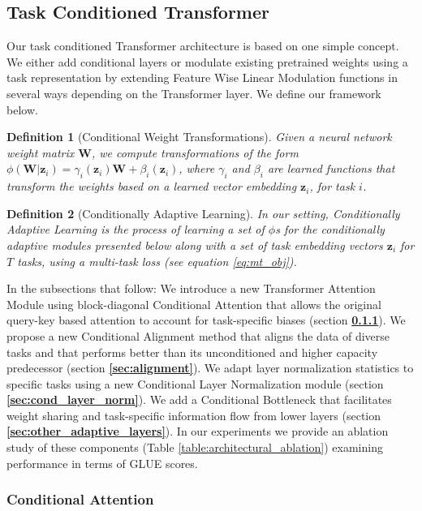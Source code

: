 \documentclass{article} \usepackage{iclr2021_conference,times}
\newtheorem{definition}{Definition}
\begin{document}
\subsection{Task Conditioned Transformer}
\label{sec:conditional_transformer}
Our task conditioned Transformer architecture is based on one simple concept. 
We either add conditional layers or modulate existing pretrained weights using a task representation by extending Feature Wise Linear Modulation \citep{Perez2018FiLMVR} functions in several ways depending on the Transformer layer. 
We define our framework below.
\begin{definition}[Conditional Weight Transformations]
Given a neural network weight matrix $\textbf{W}$, we compute transformations of the form $\phi(\textbf{W}|\textbf{z}_i)=\gamma_{i}(\textbf{z}_i) \textbf{W} + \beta_{i}(\textbf{z}_i)$, where $\gamma_i$ and $\beta_i$ are learned functions that transform the weights based on a learned vector embedding $\textbf{z}_i$, for task $i$. 
\end{definition}
\begin{definition}[Conditionally Adaptive Learning]
In our setting, Conditionally Adaptive Learning is the process of learning a set of $\phi$s for the conditionally adaptive modules presented below along with a set of task embedding vectors $\textbf{z}_i$ for $T$ tasks, using a 
multi-task loss (see equation \ref{eq:mt_obj}).
\end{definition}
In the subsections that follow:
We introduce a new Transformer Attention Module using block-diagonal Conditional Attention that allows the original query-key based attention to account for task-specific biases (section \textbf{\ref{sec:cond_attn_mat}}). 
We propose a new Conditional Alignment method that aligns the data of diverse tasks and that performs better than its unconditioned and higher capacity predecessor (section \textbf{\ref{sec:alignment}}). We adapt layer normalization statistics to specific tasks using a new Conditional Layer Normalization module (section \textbf{\ref{sec:cond_layer_norm}}). We add a Conditional Bottleneck that facilitates  weight sharing and task-specific information flow from lower layers (section \textbf{\ref{sec:other_adaptive_layers}}). In our experiments we provide an ablation study of these components (Table \ref{table:architectural_ablation}) examining performance in terms of GLUE scores.




\subsubsection{Conditional Attention}
\label{sec:cond_attn_mat}
\end{document}
